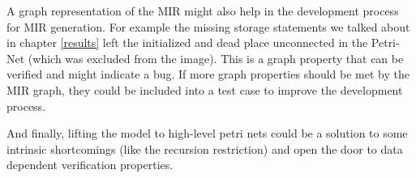 A graph representation of the MIR might also help in the development process for MIR generation.
For example the missing storage statements we talked about in chapter \ref{results} left the initialized and dead place unconnected in the Petri-Net (which was excluded from the image).
This is a graph property that can be verified and might indicate a bug.
If more graph properties should be met by the MIR graph, they could be included into a test case to improve the development process.

And finally, lifting the model to high-level petri nets could be a solution to some intrinsic shortcomings (like the recursion restriction) and open the door to data dependent verification properties.
